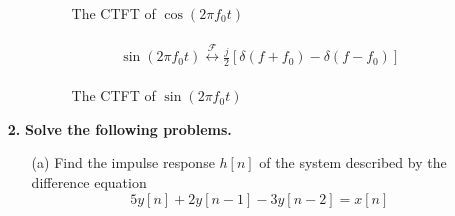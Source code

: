 \documentclass[a4paper, 12pt]{article}
\begin{document}
\begin{itemize}
\begin{itemize}
\begin{figure}[h!]
\caption{The CTFT of $\cos (2 \pi f_{0} t)$}
\end{figure}

\begin{equation}
\begin{gathered}
\begin{alignedat}{1}
\sin(2 \pi f_{0}t) \overset{\mathcal{F}}{\leftrightarrow} \frac{j}{2} \left[ \delta(f + f_{0}) - \delta (f- f_{0})\right]
\end{alignedat}
\end{gathered}
\end{equation}

\begin{figure}[h!]
\caption{The CTFT of $\sin (2 \pi f_{0} t)$}
\end{figure}
\end{itemize}

\item[\textbf{2.}]{\textbf{Solve the following problems.}}
\begin{itemize}
\item[(a)]{Find the impulse response $h[n]$ of the system described by the difference equation}
\begin{equation}
5y[n] + 2y[n-1] - 3y[n-2] = x[n]
\end{equation}


\end{itemize}
\end{itemize}
\end{document}
